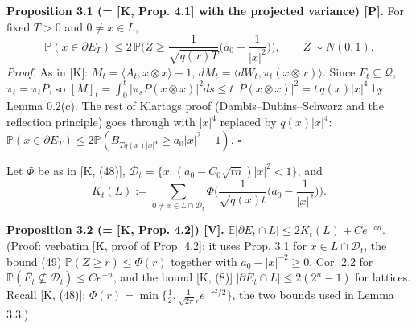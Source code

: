 \textbf{Proposition 3.1 (= {[}K, Prop. 4.1{]} with the projected variance) {[}P{]}.} For fixed \(T>0\) and \(0\ne x\in L\),
\[\mathbb P(x\in\partial E_T)\le2\,\mathbb P\Big(Z\ge\frac{1}{\sqrt{q(x)T}}\Big(a_0-\frac1{|x|^2}\Big)\Big),\qquad Z\sim N(0,1).\]
\emph{Proof.} As in {[}K{]}: \(M_t=\langle A_t,x\otimes x\rangle-1\), \(dM_t=\langle dW_t,\pi_t(x\otimes x)\rangle\). Since \(F_t\subseteq\mathcal Q\), \(\pi_t=\pi_tP\), so
\([M]_t=\int_0^t|\pi_sP(x\otimes x)|^2ds\le t\,|P(x\otimes x)|^2=t\,q(x)|x|^4\) by Lemma 0.2(c). The rest of Klartag\textquotesingle s proof (Dambis--Dubins--Schwarz and the reflection principle)
goes through with \(|x|^4\) replaced by \(q(x)|x|^4\): \(\mathbb P(x\in\partial E_T)\le2\mathbb P(B_{Tq(x)|x|^4}\ge a_0|x|^2-1)\). \(\square\)

Let \(\Phi\) be as in {[}K, (48){]}, \(\mathcal D_t=\{x:(a_0-C_0\sqrt{tn})|x|^2<1\}\), and
\[K_t(L):=\sum_{0\ne x\in L\cap\mathcal D_t}\Phi\Big(\frac{1}{\sqrt{q(x)t}}\Big(a_0-\frac1{|x|^2}\Big)\Big).\]

\textbf{Proposition 3.2 (= {[}K, Prop. 4.2{]}) {[}V{]}.} \(\mathbb E|\partial E_t\cap L|\le2K_t(L)+Ce^{-cn}\). (Proof: verbatim {[}K, proof of Prop. 4.2{]}; it uses Prop. 3.1 for \(x\in L\cap\mathcal D_t\), the bound (49) \(\mathbb P(Z\ge r)\le\Phi(r)\) together with \(a_0-|x|^{-2}\ge0\), Cor. 2.2 for \(\mathbb P(\overline{E_t}\not\subseteq\mathcal D_t)\le Ce^{-n}\), and the bound {[}K, (8){]} \(|\partial E_t\cap L|\le2(2^n-1)\) for lattices. Recall {[}K, (48){]}: \(\Phi(r)=\min\{\frac12,\frac{1}{\sqrt{2\pi}r}e^{-r^2/2}\}\), the two bounds used in Lemma 3.3.)

